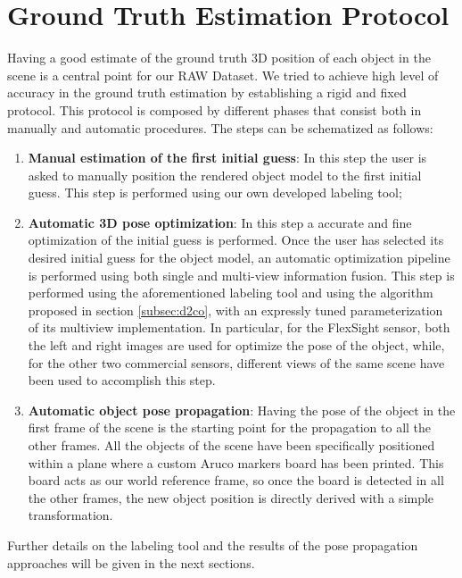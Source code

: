 \section{Ground Truth Estimation Protocol}\label{sec:ground_truth_estim}
Having a good estimate of the ground truth 3D position of each object in the scene is a central point for our RAW Dataset. We tried to achieve high level of accuracy in the ground truth estimation by establishing a rigid and fixed protocol. This protocol is composed by different phases that consist both in manually and automatic procedures. The steps can be schematized as follows:

\begin{enumerate}
	\item \textbf{Manual estimation of the first initial guess}: In this step the user is asked to manually position the rendered object model to the first initial guess. This step is performed using our own developed labeling tool;
	\item \textbf{Automatic 3D pose optimization}: In this step a accurate and fine optimization of the initial guess is performed. Once the user has selected its desired initial guess for the object model, an automatic optimization pipeline is performed using both single and multi-view information fusion. This step is performed using the aforementioned labeling tool and using the algorithm proposed in section \ref{subsec:d2co}, with an expressly tuned parameterization of its multiview implementation. In particular, for the FlexSight sensor, both the left and right images are used for optimize the pose of the object, while, for the other two commercial sensors, different views of the same scene have been used to accomplish this step.
	\item \textbf{Automatic object pose propagation}: Having the pose of the object in the first frame of the scene is the starting point for the propagation to all the other frames. All the objects of the scene have been specifically positioned within a plane where a custom Aruco markers board has been printed. This board acts as our world reference frame, so once the board is detected in all the other frames, the new object position is directly derived with a simple transformation.
\end{enumerate}

Further details on the labeling tool and the results of the pose propagation approaches will be given in the next sections.

